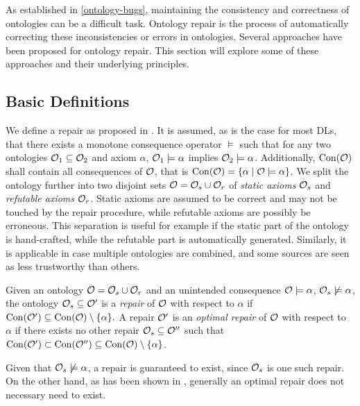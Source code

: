 
As established in \cref{ontology-bugs}, maintaining the consistency and correctness of ontologies can be a difficult task. Ontology repair is the process of automatically correcting these inconsistencies or errors in ontologies. Several approaches have been proposed for ontology repair. This section will explore some of these approaches and their underlying principles.

\subsection{Basic Definitions} \label{basic-definitions}

We define a repair as proposed in \cite{baader2018making}. It is assumed, as is the case for most DLs, that there exists a monotone consequence operator $\models$ such that for any two ontologies $\mathcal{O}_1 \subseteq \mathcal{O}_2$ and axiom $\alpha$, $\mathcal{O}_1 \models \alpha$ implies $\mathcal{O}_2 \models \alpha$. Additionally, $\operatorname{Con}(\mathcal{O})$ shall contain all consequences of $\mathcal{O}$, that is $\operatorname{Con}(\mathcal{O}) = \{ \alpha \mid \mathcal{O} \models \alpha \}$. We split the ontology further into two disjoint sets $\mathcal{O} = \mathcal{O}_s \cup \mathcal{O}_r$ of \emph{static axioms} $\mathcal{O}_s$ and \emph{refutable axioms} $\mathcal{O}_r$. Static axioms are assumed to be correct and may not be touched by the repair procedure, while refutable axioms are possibly be erroneous. This separation is useful for example if the static part of the ontology is hand-crafted, while the refutable part is automatically generated. Similarly, it is applicable in case multiple ontologies are combined, and some sources are seen as less trustworthy than others.

\begin{definition}
  Given an ontology $\mathcal{O} = \mathcal{O}_s \cup \mathcal{O}_r$ and an unintended consequence $\mathcal{O} \models \alpha$, $\mathcal{O}_s \not\models \alpha$, the ontology $\mathcal{O}_s \subseteq \mathcal{O}'$ is a \emph{repair} of $\mathcal{O}$ with respect to $\alpha$ if $\operatorname{Con}(\mathcal{O}') \subseteq \operatorname{Con}(\mathcal{O}) \setminus \{\alpha\}.$ A repair $\mathcal{O}'$ is an \emph{optimal repair} of $\mathcal{O}$ with respect to $\alpha$ if there exists no other repair $\mathcal{O}_s \subseteq \mathcal{O}''$ such that $\operatorname{Con}(\mathcal{O}') \subset \operatorname{Con}(\mathcal{O}'') \subseteq \operatorname{Con}(\mathcal{O}) \setminus \{\alpha\}$.
\end{definition}

Given that $\mathcal{O}_s \not\models \alpha$, a repair is guaranteed to exist, since $\mathcal{O}_s$ is one such repair. On the other hand, as has been shown in \cite{baader2018making}, generally an optimal repair does not necessary need to exist.

